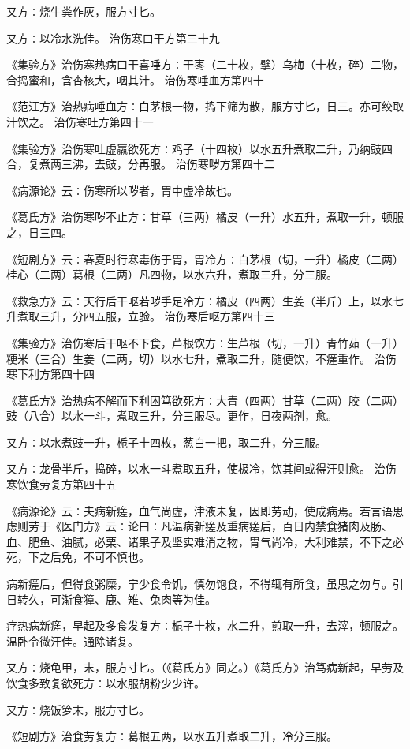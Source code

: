 \documentclass[a4paper,12pt,UTF8,twoside]{ctexbook}
\begin{document}
又方∶烧牛粪作灰，服方寸匕。

又方∶以冷水洗佳。
治伤寒口干方第三十九

《集验方》治伤寒热病口干喜唾方∶干枣（二十枚，擘）乌梅（十枚，碎）二物，合捣蜜和，含杏核大，咽其汁。
治伤寒唾血方第四十

《范汪方》治热病唾血方∶白茅根一物，捣下筛为散，服方寸匕，日三。亦可绞取汁饮之。
治伤寒吐方第四十一

《集验方》治伤寒吐虚羸欲死方∶鸡子（十四枚）以水五升煮取二升，乃纳豉四合，复煮两三沸，去豉，分再服。
治伤寒哕方第四十二

《病源论》云∶伤寒所以哕者，胃中虚冷故也。

《葛氏方》治伤寒哕不止方∶甘草（三两）橘皮（一升）水五升，煮取一升，顿服之，日三四。

《短剧方》云∶春夏时行寒毒伤于胃，胃冷方∶白茅根（切，一升）橘皮（二两）桂心（二两）葛根（二两）凡四物，以水六升，煮取三升，分三服。

《救急方》云∶天行后干呕若哕手足冷方∶橘皮（四两）生姜（半斤）上，以水七升煮取三升，分四五服，立验。
治伤寒后呕方第四十三

《集验方》治伤寒后干呕不下食，芦根饮方∶生芦根（切，一升）青竹茹（一升）粳米（三合）生姜（二两，切）以水七升，煮取二升，随便饮，不瘥重作。
治伤寒下利方第四十四

《葛氏方》治热病不解而下利困笃欲死方∶大青（四两）甘草（二两）胶（二两）豉（八合）以水一斗，煮取三升，分三服尽。更作，日夜两剂，愈。

又方∶以水煮豉一升，栀子十四枚，葱白一把，取二升，分三服。

又方∶龙骨半斤，捣碎，以水一斗煮取五升，使极冷，饮其间或得汗则愈。
治伤寒饮食劳复方第四十五

《病源论》云∶夫病新瘥，血气尚虚，津液未复，因即劳动，使成病焉。若言语思虑则劳于《医门方》云∶论曰∶凡温病新瘥及重病瘥后，百日内禁食猪肉及肠、血、肥鱼、油腻，必栗、诸果子及坚实难消之物，胃气尚冷，大利难禁，不下之必死，下之后免，不可不慎也。

病新瘥后，但得食粥糜，宁少食令饥，慎勿饱食，不得辄有所食，虽思之勿与。引日转久，可渐食獐、鹿、雉、兔肉等为佳。

疗热病新瘥，早起及多食发复方∶栀子十枚，水二升，煎取一升，去滓，顿服之。温卧令微汗佳。通除诸复。

又方∶烧龟甲，末，服方寸匕。（《葛氏方》同之。）《葛氏方》治笃病新起，早劳及饮食多致复欲死方∶以水服胡粉少少许。

又方∶烧饭箩末，服方寸匕。

《短剧方》治食劳复方∶葛根五两，以水五升煮取二升，冷分三服。
\end{document}
